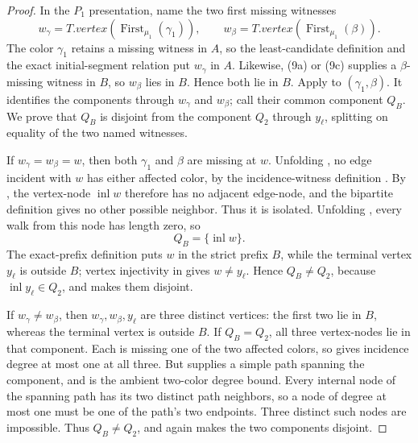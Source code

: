 \begin{proof}
In the \(P_1\) presentation, name the two first missing witnesses
\[
 w_\gamma=T.\mathit{vertex}
       (\operatorname{First}_{\mu_1}(\gamma_1)),\qquad
 w_\beta=T.\mathit{vertex}
       (\operatorname{First}_{\mu_1}(\beta)).
\]
The color \(\gamma_1\) retains a missing witness in \(A\), so the
least-candidate definition  and
the exact initial-segment relation put \(w_\gamma\) in \(A\).  Likewise,
(9a) or (9c) supplies a \(\beta\)-missing witness in \(B\), so
\(w_\beta\) lies in \(B\).  Hence both lie in \(B\).  Apply
 to \((\gamma_1,\beta)\).  It identifies the
components through \(w_\gamma\) and \(w_\beta\); call their common
component \(Q_B\).  We prove that \(Q_B\) is disjoint from the component
\(Q_2\) through \(y_\ell\), splitting on equality of the two named
witnesses.

If \(w_\gamma=w_\beta=w\), then both \(\gamma_1\) and \(\beta\) are
missing at \(w\).  Unfolding , no edge incident
with \(w\) has either affected color, by the incidence-witness definition
.  By
, the vertex-node \(\operatorname{inl}w\)
therefore has no adjacent edge-node, and the bipartite definition gives
no other possible neighbor.  Thus it is isolated.  Unfolding
, every walk from this node has length zero,
so
\[
                         Q_B=\{\operatorname{inl}w\}.
\]
The exact-prefix definition puts \(w\) in the strict prefix \(B\), while
the terminal vertex \(y_\ell\) is outside \(B\); vertex injectivity in
 gives \(w\ne y_\ell\).  Hence \(Q_B\ne Q_2\),
because \(\operatorname{inl}y_\ell\in Q_2\), and
 makes them disjoint.

If \(w_\gamma\ne w_\beta\), then
\(w_\gamma,w_\beta,y_\ell\) are three distinct vertices: the first two
lie in \(B\), whereas the terminal vertex is outside \(B\).  If
\(Q_B=Q_2\), all three vertex-nodes lie in that component.  Each is
missing one of the two affected colors, so
 gives incidence degree at most
one at all three.  But  supplies
a simple path spanning the component, and
 is the ambient two-color
degree bound.  Every internal node of the spanning path has its two
distinct path neighbors, so a node of degree at most one must be one of
the path's two endpoints.  Three distinct such nodes are impossible.
Thus \(Q_B\ne Q_2\), and
 again makes the two components
disjoint.


\end{proof}
